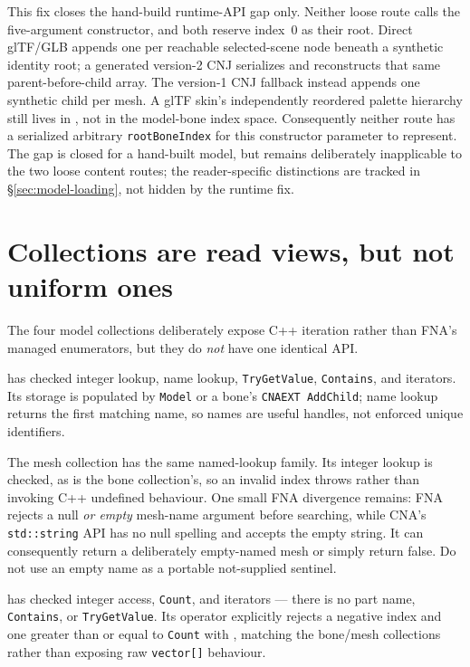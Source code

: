 This fix closes the hand-build runtime-API gap only. Neither loose route calls the five-argument
constructor, and both reserve index~0 as their root. Direct glTF/GLB appends one
 per reachable selected-scene node beneath a synthetic identity root; a
generated version-2 CNJ serializes and reconstructs that same parent-before-child array. The
version-1 CNJ fallback instead appends one synthetic child per mesh. A glTF skin's independently
reordered palette hierarchy still lives in , not in the model-bone index
space. Consequently neither route has a serialized arbitrary \texttt{rootBoneIndex} for this
constructor parameter to represent. The gap is closed for a hand-built model, but remains
deliberately inapplicable to the two loose content routes; the reader-specific distinctions are
tracked in \S\ref{sec:model-loading}, not hidden by the runtime fix.

\section{Collections are read views, but not uniform ones}
\label{sec:model-collections-contract}

The four model collections deliberately expose C++ iteration rather than FNA's managed
enumerators, but they do \emph{not} have one identical API.

 has checked integer lookup, name lookup,
\texttt{TryGetValue}, \texttt{Contains}, and iterators.
Its storage is populated by \texttt{Model} or a bone's \texttt{CNAEXT AddChild};
name lookup returns the first matching name, so names are useful handles, not enforced unique
identifiers.

The mesh collection has the same named-lookup family. Its integer lookup is checked, as is the
bone collection's, so an invalid index throws rather than invoking C++ undefined behaviour.
One small FNA divergence remains: FNA rejects a null \emph{or empty} mesh-name argument before
searching, while CNA's \texttt{std::string} API has no null spelling and accepts the empty
string. It can consequently return a deliberately empty-named mesh or simply return false.
Do not use an empty name as a portable not-supplied sentinel.

 has checked integer access, \texttt{Count}, and iterators ---
there is no part name, \texttt{Contains}, or \texttt{TryGetValue}. Its operator explicitly rejects
a negative index and one greater than or equal to \texttt{Count} with
, matching the bone/mesh collections rather than exposing
raw \texttt{vector[]} behaviour.


